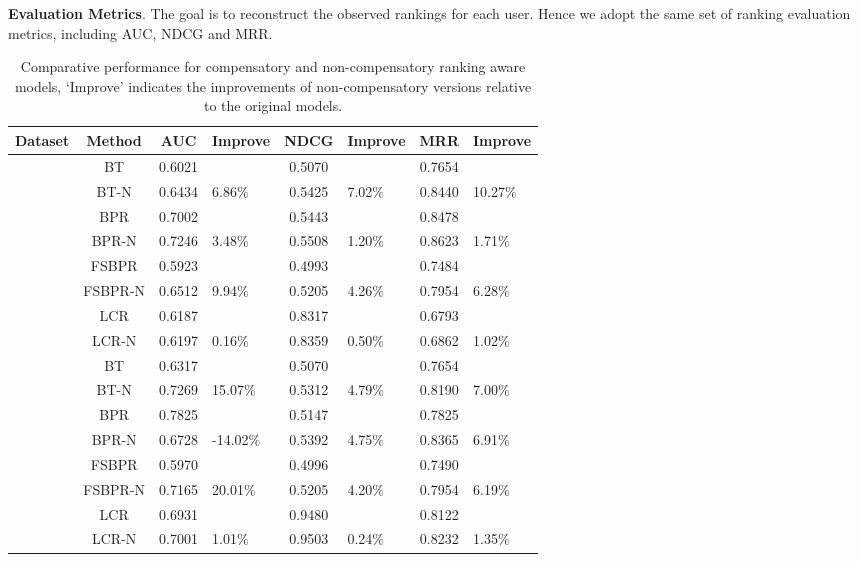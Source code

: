 \documentclass[letterpaper]{article} %
\begin{document}
\textbf{Evaluation Metrics}.  The goal is to reconstruct the observed rankings for each user. Hence we adopt the same set of ranking evaluation metrics, including AUC, NDCG and MRR. 
\begin{table}[htp]
\tiny
\caption{Comparative performance for compensatory and non-compensatory ranking aware models, `Improve' indicates the improvements of non-compensatory versions relative to the original models.}
\begin{center}
\begin{tabular}{|p{0.5cm}|c|c|p{0.8cm}|c|p{0.5cm}|c|p{0.5cm}|}
\hline
Dataset	& Method	& AUC	& Improve&	NDCG&	Improve&	MRR	&Improve\\\hline
{} 	& BT	& 0.6021 	& & 	0.5070 	& & 	0.7654 & 	\\
	& BT-N	& 0.6434 	& 6.86$\%$	& 0.5425 	& 7.02$\%$ &	0.8440 &	10.27$\%$\\
	& BPR	& 0.7002 		& & 0.5443 & & 		0.8478 & 	\\
	& BPR-N	& 0.7246 & 	3.48$\%$& 	0.5508 	& 1.20$\%$& 	0.8623 	& 1.71$\%$\\ 
	& FSBPR	& 0.5923 	& & 	0.4993 	& & 	0.7484 	& \\
	& FSBPR-N	& 0.6512 & 	9.94$\%$& 	0.5205 	& 4.26$\%$& 	0.7954 	& 6.28$\%$\\
	& LCR		&  0.6187 	&&	0.8317 	&&	0.6793 	 	&			\\
	& LCR-N		&0.6197 &	0.16$\%$&	0.8359 	& 0.50$\%$ &	0.6862 &	1.02$\%$			\\\hline
{}	& BT	& 0.6317 	& & 	0.5070 	& & 	0.7654 & \\
	& BT-N	& 0.7269 & 	15.07$\%$& 	0.5312 	& 4.79$\%$& 	0.8190 	& 7.00$\%$\\
	& BPR	& 0.7825 		& & 0.5147 	& & 	0.7825 & 	\\
	& BPR-N	& 0.6728 	& -14.02$\%$& 	0.5392 	& 4.75$\%$& 	0.8365 	& 6.91$\%$\\
	& FSBPR	& 0.5970 		& & 0.4996 	& & 	0.7490 	& \\
	& FSBPR-N		& 0.7165 	& 20.01$\%$	& 0.5205 	& 4.20$\%$	& 0.7954 	& 6.19$\%$\\
	& LCR		 &0.6931 	&&	0.9480 &&		0.8122 	 &				\\
	& LCR-N	& 0.7001 &	1.01$\%$	& 0.9503 &	0.24$\%$	& 0.8232 &	1.35$\%$ 			\\\hline		

\end{tabular}
\end{center}
\end{table}
\end{document}
